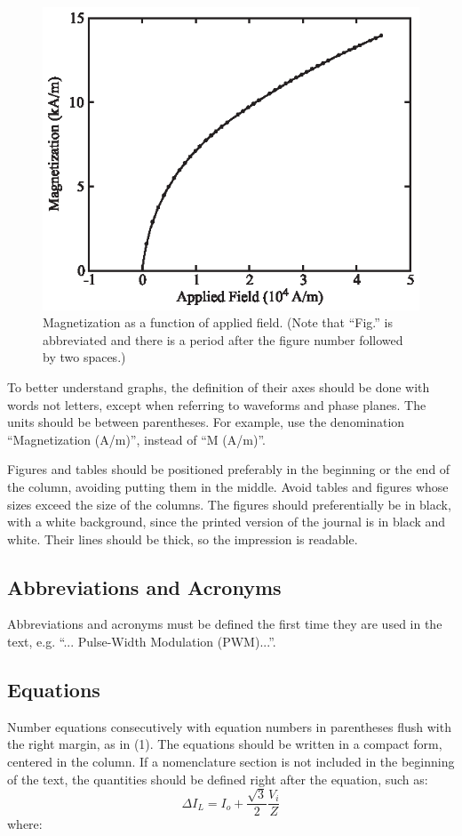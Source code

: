 \documentclass[english]{sobraep}
\begin{document}
\begin{figure}[H]
	\includegraphics[scale=1]{figure.eps}
	\centering
	\caption{Magnetization as a function of applied field. (Note that ``Fig.'' is abbreviated and there is a period after the figure number followed by two spaces.)}
	\label{fig:fig1}
\end{figure}

To better understand graphs, the definition of their axes should be done with words not letters, except when referring to waveforms and phase planes. The units should be between parentheses. For example, use the denomination ``Magnetization (A/m)'', instead of ``M (A/m)''.

Figures and tables should be positioned preferably in the beginning or the end of the column, avoiding putting them in the middle. Avoid tables and figures whose sizes exceed the size of the columns. The figures should preferentially be in black, with a white background, since the printed version of the journal is in black and white. Their lines should be thick, so the impression is readable.

\subsection{Abbreviations and Acronyms}
Abbreviations and acronyms must be defined the first time they are used in the text, e.g. ``... Pulse-Width Modulation (PWM)...''.

\subsection{Equations}
Number equations consecutively with equation numbers in parentheses flush with the right margin, as in (1). The equations should be written in a compact form, centered in the column. If a nomenclature section is not included in the beginning of the text, the quantities should be defined right after the equation, such as:
\begin{equation}
	\Delta I_{L}=I_{o}+\frac{\sqrt{3}}{2}\frac{V_{i}}{Z}
\end{equation} 
where: 
\end{document}
